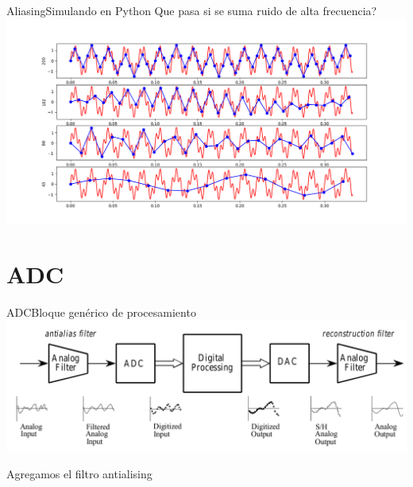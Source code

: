  \begin{frame}{Aliasing}{Simulando en Python}
    Que pasa si se suma ruido de alta frecuencia?
    \center\includegraphics[width=1.0\textwidth]{1_clase/teorema_sampleo2}
    \vfill
 \end{frame}
 \section{ADC}
 \begin{frame}{ADC}{Bloque genérico de procesamiento}
    \center\includegraphics[width=1\textwidth]{1_clase/adc_dac2}
    \begin{alertblock} {Agregamos el filtro antialising}
    \end{alertblock}
    \vfill
 \end{frame}
